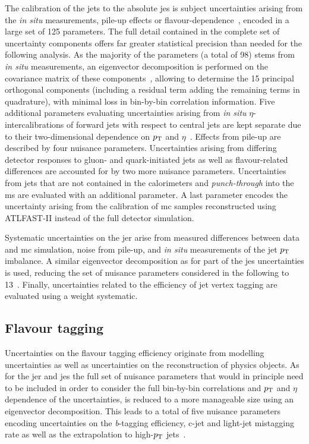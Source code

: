 The calibration of the jets to the absolute \gls{jes} is subject uncertainties arising \eg from the \textit{in situ} measurements, pile-up effects or flavour-dependence~\cite{Aad:2020flx}, encoded in a large set of 125 parameters. The full detail contained in the complete set of uncertainty components offers far greater statistical precision than needed for the following analysis. As the majority of the parameters (a total of 98) stems from \textit{in situ} measurements, an eigenvector decomposition is performed on the covariance matrix of these components~\cite{ATL-PHYS-PUB-2015-014}, allowing to determine the 15 principal orthogonal components (including a residual term adding the remaining terms in quadrature), with minimal loss in bin-by-bin correlation information. Five additional parameters evaluating uncertainties arising from \textit{in situ} $\eta$-intercalibrations of forward jets with respect to central jets are kept separate due to their two-dimensional dependence on $p_{\textrm{T}}$ and $\eta$~\cite{Aad:2020flx}. Effects from pile-up are described by four nuisance parameters. Uncertainties arising from differing detector responses to gluon- and quark-initiated jets as well as flavour-related differences are accounted for by two more nuisance parameters. Uncertainties from jets that are not contained in the calorimeters and \textit{punch-through} into the \gls{ms} are evaluated with an additional parameter. A last parameter encodes the uncertainty arising from the calibration of \gls{mc} samples reconstructed using \textsc{ATLFAST-II} instead of the full detector simulation.

Systematic uncertainties on the \gls{jer} arise from measured differences between data and \gls{mc} simulation, noise from pile-up, and \textit{in situ} measurements of the jet $p_{\textrm{T}}$ imbalance. A similar eigenvector decomposition as for part of the \gls{jes} uncertainties is used, reducing the set of nuisance parameters considered in the following to 13~\cite{Aad:2020flx}. Finally, uncertainties related to the efficiency of jet vertex tagging are evaluated using a weight systematic.

\subsection{Flavour tagging}
 
 Uncertainties on the flavour tagging efficiency originate \eg from modelling uncertainties as well as uncertainties on the reconstruction of physics objects. As for the \gls{jer} and \gls{jes} the full set of nuisance parameters that would in principle need to be included in order to consider the full bin-by-bin correlations and $p_{\textrm{T}}$ and $\eta$ dependence of the uncertainties, is reduced to a more manageable size using an eigenvector decomposition. This leads to a total of five nuisance parameters encoding uncertainties on the \textit{b}-tagging efficiency, c-jet and light-jet mistagging rate as well as the extrapolation to high-$p_{\textrm{T}}$ jets~\cite{FTAG-2018-01, PERF-2016-05}.  
 

